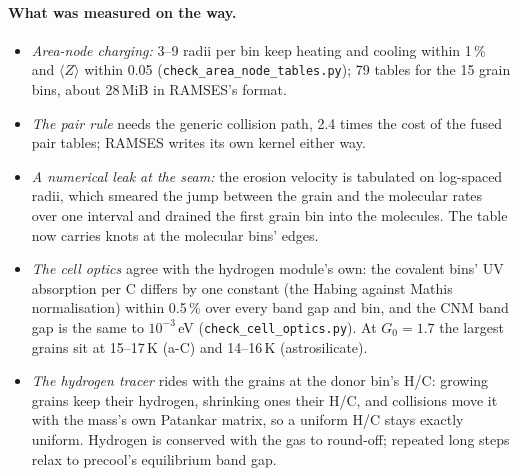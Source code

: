\documentclass[11pt,a4paper]{article}
\begin{document}
\paragraph{What was measured on the way.}
\begin{itemize}
\item \emph{Area-node charging:} 3--9 radii per bin keep heating and cooling within 1\,\% and $\langle Z\rangle$ within
  0.05 (\texttt{check\_area\_node\_tables.py}); 79 tables for the 15 grain bins, about 28\,MiB in RAMSES's format.
\item \emph{The pair rule} needs the generic collision path, 2.4 times the cost of the fused pair tables; RAMSES writes
  its own kernel either way.
\item \emph{A numerical leak at the seam:} the erosion velocity is tabulated on log-spaced radii, which smeared the
  jump between the grain and the molecular rates over one interval and drained the first grain bin into the molecules.
  The table now carries knots at the molecular bins' edges.
\item \emph{The cell optics} agree with the hydrogen module's own: the covalent bins' UV absorption per C differs by one
  constant (the Habing against Mathis normalisation) within 0.5\,\% over every band gap and bin, and the CNM band gap is
  the same to $10^{-3}$\,eV (\texttt{check\_cell\_optics.py}). At $G_0 = 1.7$ the largest grains sit at 15--17\,K
  (a-C) and 14--16\,K (astrosilicate).
\item \emph{The hydrogen tracer} rides with the grains at the donor bin's H/C: growing grains keep their hydrogen,
  shrinking ones their H/C, and collisions move it with the mass's own Patankar matrix, so a uniform H/C stays exactly
  uniform. Hydrogen is conserved with the gas to round-off; repeated long steps relax to precool's equilibrium band gap.
\end{itemize}
\end{document}
